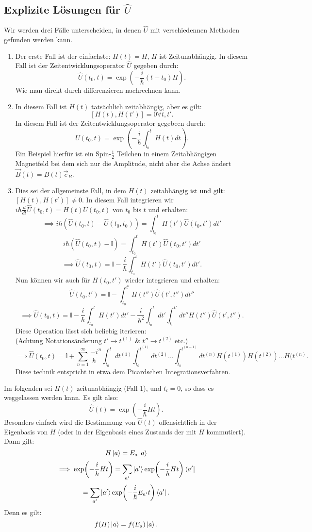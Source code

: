 \documentclass{report}
\begin{document}
\subsection{Explizite Lösungen für $\hat{U}$}
Wir werden drei Fälle unterscheiden, in denen $\hat{U}$ mit verschiedennen Methoden gefunden werden kann.
\begin{enumerate}
	\item Der erste Fall ist der einfachste: $H(t) = H$, $H$ ist Zeitunabhängig. In diesem Fall ist der Zeitentwicklungsoperator $\hat{U}$ gegeben durch: \[
			\hat{U}(t_0, t) = \exp(-\frac{i}{\hbar} (t - t_0) H)
	.\] Wie man direkt durch differenzieren nachrechnen kann. \\
\item In diesem Fall ist $H(t)$ tatsächlich zeitabhängig, aber es gilt: \[
		[H(t), H(t')] = 0 \forall t, t'
.\] In diesem Fall ist der Zeitentwicklungsoperator gegebeen durch: \[
U(t_0, t) = \exp(-\frac{i}{\hbar } \int_{t_0}^t H(t) dt)
.\] Ein Beispiel hierfür ist ein Spin-$\frac{1}{2}$ Teilchen in einem Zeitabhängigen Magnetfeld bei dem sich nur die Amplitude, nicht aber die Achse ändert $\vec{B}(t) = B(t) \vec{e}_B $.
\item Dies sei der allgemeinste Fall, in dem $H(t)$ zeitabhängig ist und gilt: $[H(t), H(t')] \neq 0$. In diesem Fall integrieren wir  $i \hbar \frac{d}{dt} \hat{U}(t_0,t) = H(t) U(t_0, t)$ von $t_0$ bis $t$ und erhalten: \[
		\implies i \hbar (\hat{U}(t_0, t) - \hat{U}(t_0, t_0)) = \int_{t_0}^{t} H(t')\hat{U}(t_0, t') dt'
\]  \[
i \hbar (\hat{U}(t_0, t) - \mathbb{I}) = \int_{t_0}^t H(t')\hat{U}(t_0, t') dt'
\] \[
\implies \hat{U}(t_0, t) = \mathbb{I} - \frac{i}{\hbar } \int_{t_0}^t H(t') \hat{U}(t_0, t') dt'
.\] Nun können wir auch für $\hat{H}(t_0, t')$ wieder integrieren und erhalten: \[
\hat{U}(t_0, t') = \mathbb{I} - \int_{t_0}^{t'} H(t'') \hat{U}(t', t'') dt''
\] \[
\implies \hat{U}(t_0, t) = \mathbb{I} - \frac{i}{\hbar} \int_{t_0}^t H(t') dt' - \frac{i}{\hbar^2} \int_{t_0}^{t} dt' \int_{t_0}^{t'} dt'' H(t'')\hat{U}(t', t'')
.\]  Diese Operation lässt sich beliebig iterieren: \\
(Achtung Notationsänderung $t' \to t^{(1)}$ \& $t'' \to t^{(2)}$ etc.) \[
	\implies \hat{U}(t_0, t) = \mathbb{I} + \sum_{n=1}^{\infty} \frac{-i}{\hbar }^n \int_{t_0}^t dt^{(1)} \int_{t_0}^{t^{(1)}} dt^{(2)} \ldots \int_{t_0}^{t^{(n-1)}} dt^{(n)} H(t^{(1)}) H(t^{(2)}) \ldots H(t^{(n)}
.\] Diese technik entspricht in etwa dem Picardschen Integrationsverfahren. 
\end{enumerate}
Im folgenden sei $H(t)$ zeitunabhängig (Fall 1), und  $t_t = 0$, so dass es weggelassen werden kann. Es gilt also:  \[
	\hat{U}(t) = \exp(-\frac{i}{\hbar }Ht)
.\] Besonders einfach wird die Bestimmung von $\hat{U}(t)$ offensichtlich in der Eigenbasis von $H$ (oder in der Eigenbasis eines Zustands der mit $H$ kommutiert). Dann  gilt: \[
H \ket{a} = E_a \ket{a} 
\] \[
\implies \exp(-\frac{i}{\hbar } Ht) = \sum_{a'} \ket{a'} \exp(-\frac{i}{\hbar } Ht) \bra{a'}  
\] \[
= \sum_{a'} \ket{a'} \exp(-\frac{i}{\hbar } E_{a'} t) \bra{a'} 
.\] Denn es gilt: \[
f(H) \ket{a}  = f(E_a) \ket{a} 
.\] \\
\end{document}
